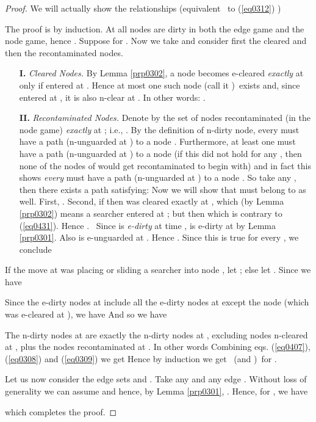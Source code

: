\documentclass[11pt]{article}\usepackage{amsmath}
\begin{document}
\begin{proof}
We will actually show the relationships (equivalent \ to (\ref{eq0312}) )

The proof is by induction. At  all nodes are dirty in both the edge game
and the node game, hence . Suppose  for . Now we take  and consider first the
cleared and then the recontaminated nodes.

\begin{enumerate}
\item[\textbf{I.}] \emph{Cleared Nodes.} By Lemma \ref{prp0302}, a node
becomes e-cleared \emph{exactly }at  only if entered at . Hence at
most one such node (call it )\ exists and, since entered at , it
is also n-clear at . In other words: .

\item[\textbf{II.}] \emph{Recontaminated Nodes.} Denote by  the set of
nodes recontaminated (in the node game) \emph{exactly} at ; i.e.,
. By the
definition of n-dirty node, every  must have a path (n-unguarded at
) to a node . Furthermore, at least
one  must have a path (n-unguarded at ) to a node  (if this did not hold for any , then none of
the nodes of  would get recontaminated to begin with) and in fact this
shows \emph{every}  must have a path (n-unguarded at ) to a node
. So take any , then there exists a
path  satisfying:
Now we will show that  must belong to  as well. First, . Second, if  then  was cleared exactly at ,
which (by Lemma \ref{prp0302}) means a searcher entered  at ; but
then  which is contrary to
(\ref{eq0431}). Hence . \ Since  is \emph{e-dirty} at time ,
 is e-dirty at  by Lemma \ref{prp0301}. Also  is e-unguarded at . Hence . Since this is true for every , we conclude

\end{enumerate}

If the move at  was placing or sliding a searcher into node , let
; else let . Since  we have

Since the e-dirty nodes at  include all the e-dirty nodes at  except
the node  (which was e-cleared at ), we have
And so we have

The n-dirty nodes at  are exactly the n-dirty nodes at , excluding
nodes n-cleared at , plus the nodes recontaminated at . In other
words
Combining eqs. (\ref{eq0407}), (\ref{eq0308}) and (\ref{eq0309}) we get
Hence by induction we get  \ (and )\ for  .

Let us now consider the edge sets  and . Take any  and any edge . Without loss of generality we can assume  and hence, by Lemma
\ref{prp0301}, . Hence, for ,
we have

which completes the proof.
\end{proof}
\end{document}
